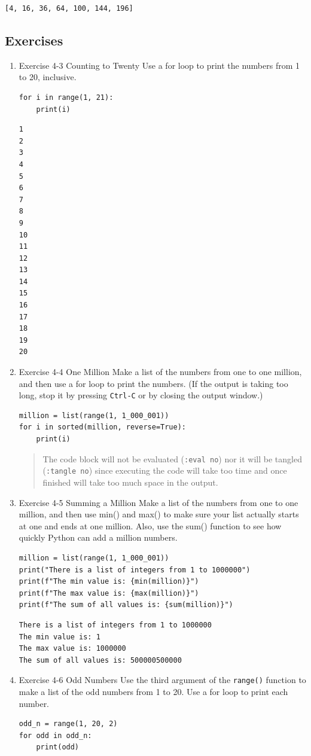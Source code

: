 \documentclass[10pt]{book}
\begin{document}
\label{org2d491f3}
\begin{verbatim}
[4, 16, 36, 64, 100, 144, 196]
\end{verbatim}
\subsection{Exercises}
\label{sec:org24bb4cc}
\begin{enumerate}
\item Exercise 4-3 Counting to Twenty
\label{sec:org27ab5a6}
Use a for loop to print the numbers from 1 to 20, inclusive.
\begin{verbatim}
for i in range(1, 21):
    print(i)
\end{verbatim}

\label{org1e038f3}
\begin{verbatim}
1
2
3
4
5
6
7
8
9
10
11
12
13
14
15
16
17
18
19
20
\end{verbatim}
\item Exercise 4-4 One Million
\label{sec:orgf499256}
Make a list of the numbers from one to one million, and then use a for loop to print the numbers. (If the output is taking too long, stop it by pressing \texttt{Ctrl-C} or by closing the output window.)
\begin{verbatim}
million = list(range(1, 1_000_001))
for i in sorted(million, reverse=True):
    print(i)
\end{verbatim}

\begin{quote}
The code block will not be evaluated (\texttt{:eval no}) nor it will be tangled (\texttt{:tangle no}) since executing the code will take too time and once finished will take too much space in the output.
\end{quote}
\item Exercise 4-5 Summing a Million
\label{sec:orgf1ee9fd}
Make a list of the numbers from one to one million, and then use min() and max() to make sure your list actually starts at one and ends at one million. Also, use the sum() function to see how quickly Python can add a million numbers.
\begin{verbatim}
million = list(range(1, 1_000_001))
print("There is a list of integers from 1 to 1000000")
print(f"The min value is: {min(million)}")
print(f"The max value is: {max(million)}")
print(f"The sum of all values is: {sum(million)}")
\end{verbatim}

\label{orgd3dc0a7}
\begin{verbatim}
There is a list of integers from 1 to 1000000
The min value is: 1
The max value is: 1000000
The sum of all values is: 500000500000
\end{verbatim}
\item Exercise 4-6 Odd Numbers
\label{sec:org67c8a4d}
Use the third argument of the \texttt{range()} function to make a list of the odd numbers from 1 to 20. Use a for loop to print each number.
\begin{verbatim}
odd_n = range(1, 20, 2)
for odd in odd_n:
    print(odd)
\end{verbatim}


\end{enumerate}
\end{document}
